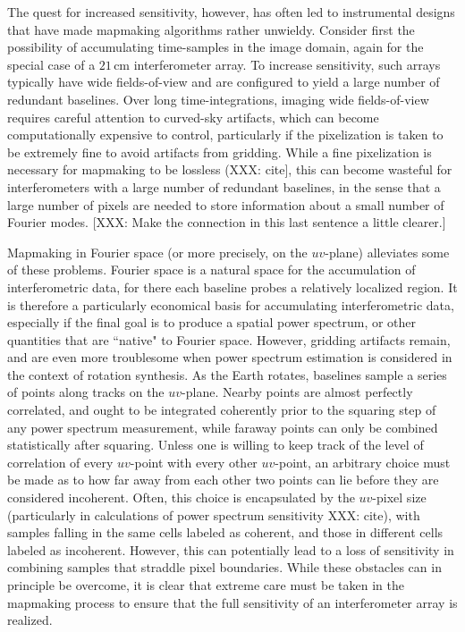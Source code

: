 \documentclass[twocolumn,apj,numberedappendix]{emulateapj}
\begin{document}
The quest for increased sensitivity, however, has often led to instrumental designs that have made mapmaking algorithms rather unwieldy.  Consider first the possibility of accumulating time-samples in the image domain, again for the special case of a $21\,\textrm{cm}$ interferometer array.  To increase sensitivity, such arrays typically have wide fields-of-view and are configured to yield a large number of redundant baselines.  Over long time-integrations, imaging wide fields-of-view requires careful attention to curved-sky artifacts, which can become computationally expensive to control, particularly if the pixelization is taken to be extremely fine to avoid artifacts from gridding.  While a fine pixelization is necessary for mapmaking to be lossless (XXX: cite], this can become wasteful for interferometers with a large number of redundant baselines, in the sense that a large number of pixels are needed to store information about a small number of Fourier modes. [XXX: Make the connection in this last sentence a little clearer.]

Mapmaking in Fourier space (or more precisely, on the $uv$-plane) alleviates some of these problems.  Fourier space is a natural space for the accumulation of interferometric data, for there each baseline probes a relatively localized region.  It is therefore a particularly economical basis for accumulating interferometric data, especially if the final goal is to produce a spatial power spectrum, or other quantities that are ``native" to Fourier space.  However, gridding artifacts remain, and are even more troublesome when power spectrum estimation is considered in the context of rotation synthesis.  As the Earth rotates, baselines sample a series of points along tracks on the $uv$-plane.  Nearby points are almost perfectly correlated, and ought to be integrated coherently prior to the squaring step of any power spectrum measurement, while faraway points can only be combined statistically after squaring.  Unless one is willing to keep track of the level of correlation of every $uv$-point with every other $uv$-point, an arbitrary choice must be made as to how far away from each other two points can lie before they are considered incoherent.  Often, this choice is encapsulated by the $uv$-pixel size (particularly in calculations of power spectrum sensitivity XXX: cite), with samples falling in the same cells labeled as coherent, and those in different cells labeled as incoherent.  However, this can potentially lead to a loss of sensitivity in combining samples that straddle pixel boundaries.  While these obstacles can in principle be overcome, it is clear that extreme care must be taken in the mapmaking process to ensure that the full sensitivity of an interferometer array is realized.
\end{document}
